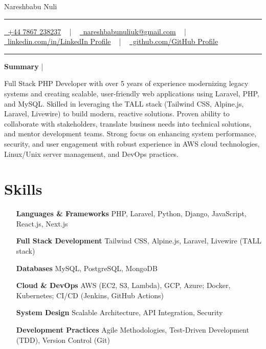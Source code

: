 \documentclass[letterpaper,10pt]{article}
\newcommand{\documentTitle}[2]{
  \begin{center}
    {\Huge\color{accentTitle} #1}
    \vspace{10pt}
    {\color{accentLine} \hrule}
    \vspace{2pt}
    \footnotesize{#2}
    \vspace{2pt}
    {\color{accentLine} \hrule}
  \end{center}
}
\newcommand{\tinysection}[1]{
  \phantomsection
  \addcontentsline{toc}{section}{#1}
  {\large{\bfseries\color{accentText}#1} {\color{accentLine} |}}
}
\begin{document}

  \documentTitle{Nareshbabu Nuli}{
    \href{tel:+447867238237}{
      \raisebox{-0.05\height} \faPhone\ +44 7867 238237} ~ | ~
    \href{mailto:nareshbabunuliuk@gmail.com}{
      \raisebox{-0.15\height} \faEnvelope\ nareshbabunuliuk@gmail.com} ~ | ~
    \href{https://linkedin.com/in/LinkedIn Profile}{
      \raisebox{-0.15\height} \faLinkedin\ linkedin.com/in/LinkedIn Profile} ~ | ~
    \href{https://github.com/GitHub Profile}{
      \raisebox{-0.15\height} \faGithub\ github.com/GitHub Profile}
  }


  \tinysection{Summary}
  Full Stack PHP Developer with over 5 years of experience modernizing legacy systems and creating scalable, user-friendly web applications using Laravel, PHP, and MySQL. Skilled in leveraging the TALL stack (Tailwind CSS, Alpine.js, Laravel, Livewire) to build modern, reactive solutions. Proven ability to collaborate with stakeholders, translate business needs into technical solutions, and mentor development teams. Strong focus on enhancing system performance, security, and user engagement with robust experience in AWS cloud technologies, Linux/Unix server management, and DevOps practices.


  \section{Skills}

  \begin{multicols}{2}
    \begin{itemize}[itemsep=-2px, parsep=1pt, leftmargin=75pt]
      \item[\textbf{Languages \& Frameworks}] PHP, Laravel, Python, Django, JavaScript, React.js, Next.js
      \item[\textbf{Full Stack Development}] Tailwind CSS, Alpine.js, Laravel, Livewire (TALL stack)
      \item[\textbf{Databases}] MySQL, PostgreSQL, MongoDB
      \item[\textbf{Cloud \& DevOps}] AWS (EC2, S3, Lambda), GCP, Azure; Docker, Kubernetes; CI/CD (Jenkins, GitHub Actions)
      \item[\textbf{System Design}] Scalable Architecture, API Integration, Security
      \item[\textbf{Development Practices}] Agile Methodologies, Test-Driven Development (TDD), Version Control (Git)
    \end{itemize}
  \end{multicols}
\end{document}

